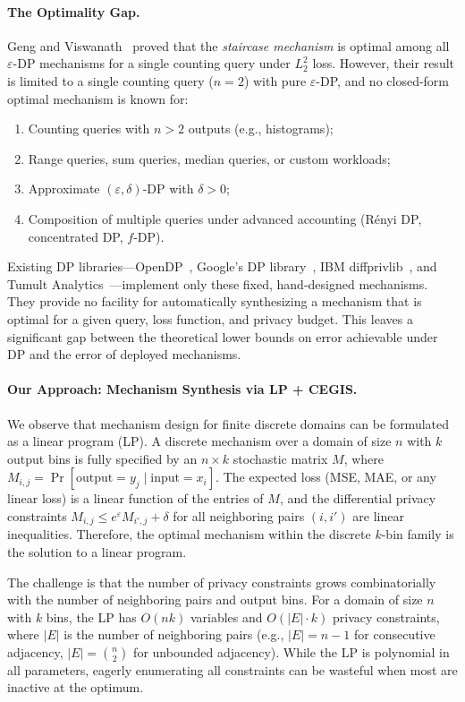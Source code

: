 \documentclass[11pt,a4paper]{article}
\newcommand{\eps}{\varepsilon}
\begin{document}
\paragraph{The Optimality Gap.}
Geng and Viswanath~\cite{geng2014optimal} proved that the \emph{staircase mechanism}
is optimal among all $\eps$-DP mechanisms for a single counting query under $L_2^2$
loss.  However, their result is limited to a single counting query ($n=2$) with
pure $\eps$-DP, and no closed-form optimal mechanism is known for:
\begin{enumerate}[nosep]
  \item Counting queries with $n > 2$ outputs (e.g., histograms);
  \item Range queries, sum queries, median queries, or custom workloads;
  \item Approximate $(\eps,\delta)$-DP with $\delta > 0$;
  \item Composition of multiple queries under advanced accounting (R\'enyi DP,
        concentrated DP, $f$-DP).
\end{enumerate}
Existing DP libraries---OpenDP~\cite{opendp2023}, Google's DP
library~\cite{google2019dp}, IBM diffprivlib~\cite{holohan2019diffprivlib}, and
Tumult Analytics~\cite{tumult2022}---implement only these fixed, hand-designed
mechanisms.  They provide no facility for automatically synthesizing a mechanism
that is optimal for a given query, loss function, and privacy budget.  This
leaves a significant gap between the theoretical lower bounds on error achievable
under DP and the error of deployed mechanisms.

\paragraph{Our Approach: Mechanism Synthesis via LP + CEGIS.}
We observe that mechanism design for finite discrete domains can be formulated
as a linear program (LP).  A discrete mechanism over a domain of size $n$ with
$k$ output bins is fully specified by an $n \times k$ stochastic matrix $M$,
where $M_{i,j} = \Pr[\text{output} = y_j \mid \text{input} = x_i]$.  The expected
loss (MSE, MAE, or any linear loss) is a linear function of the entries of $M$,
and the differential privacy constraints
$M_{i,j} \le e^{\eps} M_{i',j} + \delta$ for all neighboring pairs $(i,i')$
are linear inequalities.  Therefore, the optimal mechanism within the discrete
$k$-bin family is the solution to a linear program.

The challenge is that the number of privacy constraints grows combinatorially
with the number of neighboring pairs and output bins.  For a domain of size $n$
with $k$ bins, the LP has $O(nk)$ variables and $O(|E| \cdot k)$ privacy
constraints, where $|E|$ is the number of neighboring pairs (e.g., $|E| = n-1$
for consecutive adjacency, $|E| = \binom{n}{2}$ for unbounded adjacency).  While
the LP is polynomial in all parameters, eagerly enumerating all constraints can
be wasteful when most are inactive at the optimum.
\end{document}
